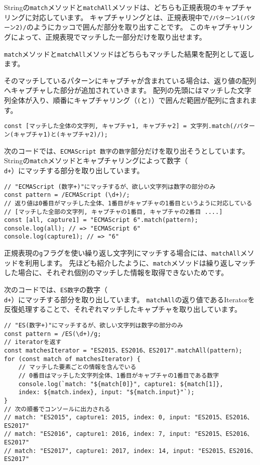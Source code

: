 Stringの\texttt{match}メソッドと\texttt{matchAll}メソッドは、どちらも正規表現のキャプチャリングに対応しています。
キャプチャリングとは、正規表現中で\texttt{/パターン1(パターン2)/}のようにカッコで囲んだ部分を取り出すことです。
このキャプチャリングによって、正規表現でマッチした一部分だけを取り出せます。

\texttt{match}メソッドと\texttt{matchAll}メソッドはどちらもマッチした結果を配列として返します。

そのマッチしているパターンにキャプチャが含まれている場合は、返り値の配列へキャプチャした部分が追加されていきます。
配列の先頭にはマッチした文字列全体が入り、順番にキャプチャリング（\texttt{(}と\texttt{)}）で囲んだ範囲が配列に含まれます。

\begin{lstlisting}
const [マッチした全体の文字列, キャプチャ1, キャプチャ2] = 文字列.match(/パターン(キャプチャ1)と(キャプチャ2)/);
\end{lstlisting}

次のコードでは、\texttt{ECMAScript 数字}の\texttt{数字}部分だけを取り出そうとしています。
Stringの\texttt{match}メソッドとキャプチャリングによって数字（\texttt{\\d+}）にマッチする部分を取り出しています。

\begin{lstlisting}
// "ECMAScript (数字+)"にマッチするが、欲しい文字列は数字の部分のみ
const pattern = /ECMAScript (\d+)/;
// 返り値は0番目がマッチした全体、1番目がキャプチャの1番目というように対応している
// [マッチした全部の文字列, キャプチャの1番目, キャプチャの2番目 ....]
const [all, capture1] = "ECMAScript 6".match(pattern);
console.log(all); // => "ECMAScript 6"
console.log(capture1); // => "6"
\end{lstlisting}

正規表現の\texttt{g}フラグを使い繰り返し文字列にマッチする場合には、\texttt{matchAll}メソッドを利用します。
先ほども紹介したように、\texttt{match}メソッドは繰り返しマッチした場合に、それぞれ個別のマッチした情報を取得できないためです。

次のコードでは、\texttt{ES数字}の数字（\texttt{\\d+}）にマッチする部分を取り出しています。
\texttt{matchAll}の返り値であるIteratorを反復処理することで、それぞれマッチしたキャプチャを取り出しています。

\begin{lstlisting}
// "ES(数字+)"にマッチするが、欲しい文字列は数字の部分のみ
const pattern = /ES(\d+)/g;
// iteratorを返す
const matchesIterator = "ES2015、ES2016、ES2017".matchAll(pattern);
for (const match of matchesIterator) {
    // マッチした要素ごとの情報を含んでいる
    // 0番目はマッチした文字列全体、1番目がキャプチャの1番目である数字
    console.log(`match: "${match[0]}", capture1: ${match[1]}, 
    index: ${match.index}, input: "${match.input}"`);
}
// 次の順番でコンソールに出力される
// match: "ES2015", capture1: 2015, index: 0, input: "ES2015、ES2016、ES2017"
// match: "ES2016", capture1: 2016, index: 7, input: "ES2015、ES2016、ES2017"
// match: "ES2017", capture1: 2017, index: 14, input: "ES2015、ES2016、ES2017"
\end{lstlisting}


